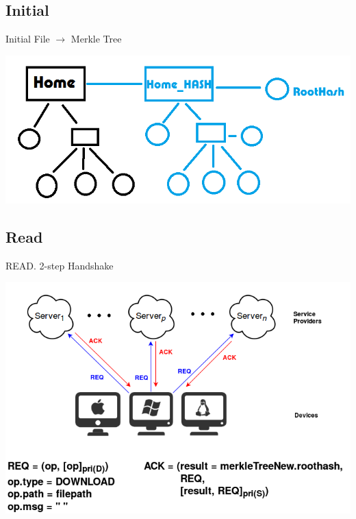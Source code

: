 \documentclass{beamer}
\newcommand{\RNum}[1]{\uppercase\expandafter{\romannumeral #1\relax}}
\begin{document}
\begin{CJK}{UTF8}{bkai}
\subsection{Initial}
\begin{frame}{Initial}
	\alert{File $\rightarrow$ Merkle Tree}\\
	\begin{center}
	\includegraphics[width=1\textwidth]{init.png}
	\end{center}
\end{frame}

\subsection{Read}
\begin{frame}{READ}{\RNum{1}. 2-step Handshake}
	\begin{center}
	\includegraphics[width=.85\textwidth]{Read1.png}
	\end{center}
\end{frame}


\end{CJK}
\end{document}
